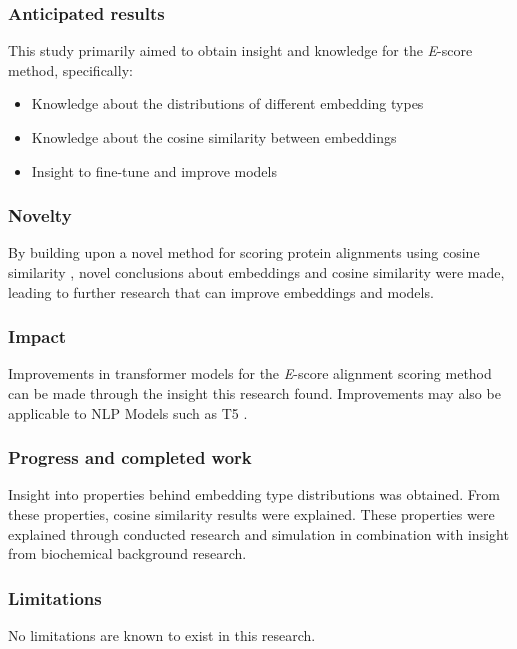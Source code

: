 \subsubsection*{Anticipated results}
This study primarily aimed to obtain insight and knowledge for the \textit{E}-score method, specifically:
\begin{itemize}
    \item{Knowledge about the distributions of different embedding types}
    \item{Knowledge about the cosine similarity between embeddings}
    \item{Insight to fine-tune and improve models}
\end{itemize}

\subsubsection*{Novelty}
By building upon a novel method for scoring protein alignments using cosine similarity \autocite{Ashrafzadeh:2023}, novel conclusions about embeddings and cosine similarity were made, leading to further research that can improve embeddings and models.

\subsubsection*{Impact}
Improvements in transformer models for the \textit{E}-score alignment scoring method can be made through the insight this research found. Improvements may also be applicable to \gls{NLP} Models such as T5 \autocite{Raffel:2020}.

\subsubsection*{Progress and completed work}
Insight into properties behind embedding type distributions was obtained. From these properties, cosine similarity results were explained. These properties were explained through conducted research and simulation in combination with insight from biochemical background research.

\subsubsection*{Limitations}
No limitations are known to exist in this research.

\cleardoublepage
{}

\renewcommand\contentsname{Table of Contents}
\tableofcontents
\cleardoublepage
{}

\cleardoublepage
{}

